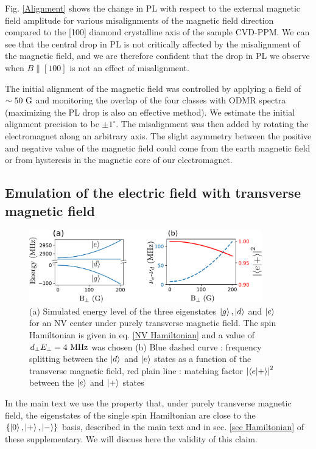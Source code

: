 \documentclass[preprintnumbers,amsmath,amssymb,onecolumn,12pt]{revtex4-2}\usepackage{graphicx}%
\begin{document}
Fig. \ref{Alignment} shows the change in PL with respect to the external magnetic field amplitude for various misalignments of the magnetic field direction compared to the [100] diamond crystalline axis of the sample CVD-PPM. We can see that the central drop in PL is not critically affected by the misalignment of the magnetic field, and we are therefore confident that the drop in PL we observe when $B\parallel [100]$ is not an effect of misalignment.

The initial alignment of the magnetic field was controlled by applying a field of $\sim 50\ \rm G$ and monitoring the overlap of the four classes with ODMR spectra (maximizing the PL drop is also an effective method). We estimate the initial alignment precision to be $\pm 1^\circ$. The misalignment was then added by rotating the electromagnet along an arbitrary axis. The slight asymmetry between the positive and negative value of the magnetic field could come from the earth magnetic field or from hysteresis in the magnetic core of our electromagnet.

\subsection{Emulation of the electric field with transverse magnetic field}
\begin{figure}
\includegraphics[width=0.9\textwidth]{Figures_SI/fig_transverse_field}
\caption{(a) Simulated energy level of the three eigenstates $\ket{g},\ket{d}$ and $\ket{e}$ for an NV center under purely transverse magnetic field. The spin Hamiltonian is given in eq. \ref{NV Hamiltonian} and a value of $d_\perp E_\perp = 4\ \rm MHz$ was chosen (b) Blue dashed curve : frequency splitting between the $\ket{d}$ and $\ket{e}$ states as a function of the transverse magnetic field, red plain line : matching factor $\abs{\bra{e}\ket{+}}^2$ between the $\ket{e}$ and $\ket{+}$ states}
\label{theory_transverse_field}
\end{figure}
In the main text we use the property that, under purely transverse magnetic field, the eigenstates of the single spin Hamiltonian are close to the $\{ \ket{0},\ket{+},\ket{-} \}$ basis, described in the main text and in sec. \ref{sec Hamiltonian} of these supplementary. We will discuss here the validity of this claim.
\end{document}
